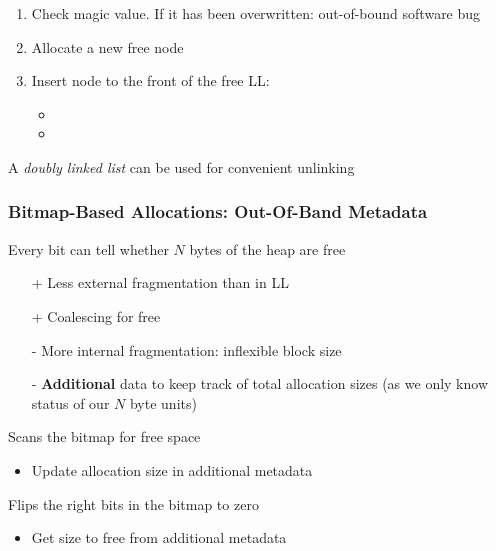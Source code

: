 \newpar{}

\begin{enumerate}
    \item Check magic value. If it has been overwritten: out-of-bound software bug
    \item Allocate a new free node
    \item Insert node to the front of the free LL:
          \begin{itemize}
              \item {}
              \item {}
          \end{itemize}
\end{enumerate}
A \textit{doubly linked list} can be used for convenient unlinking

\subsubsection[Bitmap-Based Allocations]{Bitmap-Based Allocations: Out-Of-Band Metadata}
Every bit can tell whether $N$ bytes of the heap are free
\begin{itemize}
    \item [+] Less external fragmentation than in LL
    \item [+] Coalescing for free
    \item [-] More internal fragmentation: inflexible block size
    \item [-] \textbf{Additional} data to keep track of total allocation sizes (as we only know status of our $N$ byte units)
\end{itemize}

\newpar{}

Scans the bitmap for free space %
\begin{itemize}
    \item Update allocation size in additional metadata
\end{itemize}

\newpar{}

Flips the right bits in the bitmap to zero %
\begin{itemize}
    \item Get size to free from additional metadata
\end{itemize}

\newpar{}

